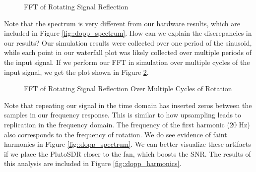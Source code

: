 \documentclass{article}
\begin{document}
\begin{figure}[H]
    	\centering
    	\caption{FFT of Rotating Signal Reflection}
    	\label{fig::freq_response}
\end{figure}

\noindent Note that the spectrum is very different from our hardware results, which are included in Figure \ref{fig::dopp_spectrum}. How can we explain the discrepancies in our results? Our simulation results were collected over one period of the sinusoid, while each point in our waterfall plot was likely collected over multiple periods of the input signal. If we perform our FFT in simulation over multiple cycles of the input signal, we get the plot shown in Figure \ref{fig::freq_response_multi_cycle}.

\begin{figure}[H]
    	\centering
    	\caption{FFT of Rotating Signal Reflection Over Multiple Cycles of Rotation}
    	\label{fig::freq_response_multi_cycle}
\end{figure}

\noindent Note that repeating our signal in the time domain has inserted zeros between the samples in our frequency response. This is similar to how upsampling leads to replication in the frequency domain. The frequency of the first harmonic (20 Hz) also corresponds to the frequency of rotation. We do see evidence of faint harmonics in Figure \ref{fig::dopp_spectrum}. We can better visualize these artifacts if we place the PlutoSDR closer to the fan, which boosts the SNR. The results of this analysis are included in Figure \ref{fig::dopp_harmonics}.
\end{document}
